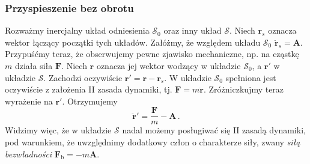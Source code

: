 \documentclass[../main.tex]{subfiles}
\begin{document}
\subsubsection{Przyspieszenie bez obrotu}
Rozważmy inercjalny układ odniesienia \(\mathcal{S}_0\) oraz inny układ \(\mathcal{S}\). Niech
\(\mathbf{r}_s\) oznacza wektor łączący początki tych układów. Załóżmy, że względem układu
\(\mathcal{S}_0\) \(\ddot{\mathbf{r}}_s=\mathbf{A}\). Przypuśćmy teraz, że obserwujemy pewne
zjawisko mechaniczne, np. na cząstkę \(m\) działa siła \(\mathbf{F}\). Niech \(\mathbf{r}\) oznacza
jej wektor wodzący w układzie \(\mathcal{S}_0\), a \(\mathbf{r}'\) w układzie \(\mathcal{S}\).
Zachodzi oczywiście \(\mathbf{r}'=\mathbf{r}-\mathbf{r}_s\). W układzie \(\mathcal{S}_0\) spełniona
jest oczywiście z założenia II zasada dynamiki, tj. \(\mathbf{F}=m\ddot{\mathbf{r}}\). Zróżniczkujmy
teraz wyrażenie na \(\mathbf{r}'\). Otrzymujemy
\begin{equation*}
    \ddot{\mathbf{r}}'=\frac{\mathbf{F}}{m}-\mathbf{A}\,.
\end{equation*}
Widzimy więc, że w układzie \(\mathcal{S}\) nadal możemy posługiwać się II zasadą dynamiki, pod
warunkiem, że uwzględnimy dodatkowy człon o charakterze siły, zwany \textit{siłą bezwładności}
\(\mathbf{F}_\text{b}=-m\mathbf{A}\).
\end{document}
